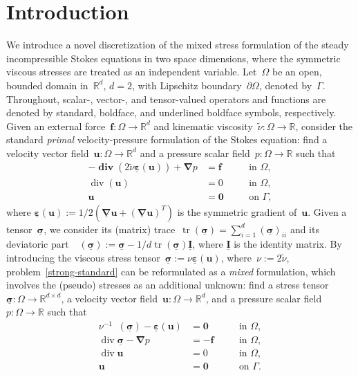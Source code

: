 \documentclass[a4paper,twoside,10pt]{article}
\theoremstyle{plain}
\theoremstyle{remark}
\theoremstyle{definition}
\numberwithin{equation}{section}
\numberwithin{figure}{section}
\newcommand{\Rbb}{\mathbb{R}}
\newcommand{\Rbbd}{\mathbb{R}^d}
\newcommand{\Rbbdd}{\mathbb{R}^{d\times d}}
\newcommand{\sigmabf}{\underline{\boldsymbol{\sigma}}}
\newcommand{\ubf}{\mathbf{u}}
\DeclareMathOperator{\dive}{div}
\DeclareMathOperator{\divebf}{\mathbf{div}}
\DeclareMathOperator{\dev}{\underline{\mathbf{dev}}}
\DeclareMathOperator{\tr}{tr}
\newcommand{\zerobf}{\mathbf{0}}
\newcommand{\fbf}{\mathbf{f}}
\newcommand{\nablabf}{\boldsymbol{\nabla}}
\newcommand{\epsbfun}{\underline{\boldsymbol{\varepsilon}}}
\newcommand{\nablabfun}{\underline{\boldsymbol{\nabla}}}
\newcommand{\Idbf}{\underline{\mathbf{I}}}
\newcommand{\nutilde}{\widetilde{\nu}}
\begin{document}
\section{Introduction} \label{section:introduction}
We introduce a novel discretization of the mixed stress formulation of
the steady incompressible Stokes equations in two space dimensions,
where the symmetric viscous stresses are treated as an independent variable.
Let~$\Omega$ be an open, bounded domain in~$\Rbbd$, $d=2$,
with Lipschitz boundary~$\partial\Omega$, denoted by~$\Gamma$.
Throughout,
scalar-, vector-, and tensor-valued operators and functions
are denoted by standard, boldface, and underlined boldface symbols, respectively.
Given an external force~$\fbf: \Omega \to \Rbbd$
and kinematic viscosity~$\nutilde: \Omega \to \Rbb$,
consider the standard \emph{primal} velocity-pressure formulation of the Stokes equation:
find a velocity vector field~$\ubf: \Omega \to \Rbbd$
and a pressure scalar field~$p: \Omega \to \Rbb$
such that
\begin{subequations}\label{strong-standard}
\begin{alignat}{2}
-\divebf(2\nutilde\epsbfun(\ubf)) + \nablabf p &= \fbf      \quad && \text{in } \Omega, \\
\dive(\ubf)                                    &= 0         \quad &&\text{in } \Omega, \\
\ubf                                           &= \zerobf   \quad &&\text{on } \Gamma,
\end{alignat}
\end{subequations}
where $\epsbfun(\ubf) := 1/2(\nablabfun\ubf + (\nablabfun\ubf)^T)$ is the symmetric gradient of~$\ubf$.
Given a tensor~$\sigmabf$,
we consider its (matrix) trace~$\tr(\sigmabf) = \sum_{i=1}^d (\sigmabf)_{ii}$
and its deviatoric part~$\dev(\sigmabf) := \sigmabf - 1/d \tr(\sigmabf) \Idbf$, where $\Idbf$ is the identity matrix.
By introducing the viscous stress tensor~$\sigmabf := \nu\epsbfun(\ubf)$,
where~$\nu := 2 \nutilde$,
problem~\eqref{strong-standard} can be reformulated
as a \emph{mixed} formulation,
which involves the (pseudo) stresses as an additional unknown:
find
a stress tensor~$\sigmabf: \Omega \to \Rbbdd$,
a velocity vector field~$\ubf: \Omega \to \Rbbd$,
and a pressure scalar field~$p: \Omega \to \Rbb$
such that
\begin{subequations} \label{strong-mixed}
\begin{alignat}{2}
\nu^{-1}\dev(\sigmabf) - \epsbfun(\ubf)        &= \zerobf  \quad && \text{in }\Omega, \\
\dive\sigmabf - \nablabf p                     &= -\fbf    \quad && \text{in }\Omega, \\
\dive\ubf                                      &= 0        \quad && \text{in }\Omega, \\
\ubf                                           &= \zerobf  \quad && \text{on }\Gamma.
\end{alignat} 
\end{subequations}
\end{document}
